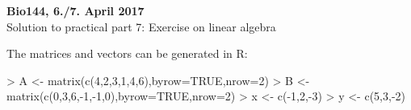 \documentclass[a4paper,12pt]{scrartcl}
\begin{document}
\begin{center}
{\bf Bio144, 6./7. April 2017} \\[8mm] 
{\large Solution to practical part 7: Exercise on linear algebra}\\[10mm]
\end{center}

 

The matrices and vectors can be generated in R:

\begin{Schunk}
\begin{Sinput}
> A <- matrix(c(4,2,3,1,4,6),byrow=TRUE,nrow=2)
> B <- matrix(c(0,3,6,-1,-1,0),byrow=TRUE,nrow=2)
> x <- c(-1,2,-3)
> y <- c(5,3,-2)
\end{Sinput}
\end{Schunk}
\end{document}
